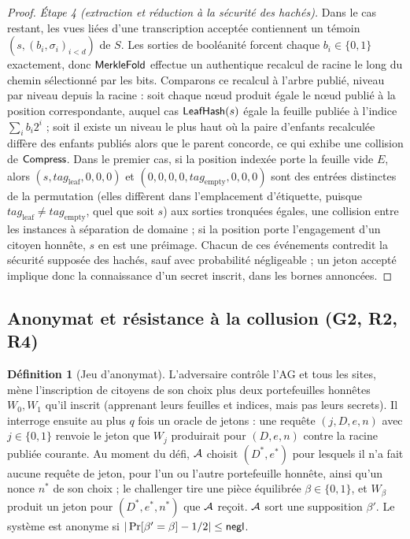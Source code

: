 \documentclass[11pt]{article}
\theoremstyle{definition}
\newtheorem{definitionx}{D\'efinition}
\begin{document}
\begin{proof}
\emph{Étape 4 (extraction et réduction à la sécurité des hachés).} Dans le cas restant,
les vues liées d'une transcription acceptée contiennent un témoin $(s, (b_i,
\sigma_i)_{i<d})$ de $S$. Les sorties de booléanité forcent chaque $b_i \in \{0,1\}$
exactement, donc $\mathsf{MerkleFold}$ effectue un authentique recalcul de racine le long du
chemin sélectionné par les bits. Comparons ce recalcul à l'arbre publié, niveau par niveau
depuis la racine : soit chaque n\oe ud produit égale le n\oe ud publié à la position
correspondante, auquel cas $\mathsf{LeafHash}(s)$ égale la feuille publiée à l'indice $\sum_i b_i
2^i$ ; soit il existe un niveau le plus haut où la paire d'enfants recalculée diffère des
enfants publiés alors que le parent concorde, ce qui exhibe une collision de $\mathsf{Compress}$.
Dans le premier cas, si la position indexée porte la feuille vide $E$, alors $(s,
\mathit{tag}_{\mathrm{leaf}}, 0, 0, 0)$ et $(0,0,0,0,\mathit{tag}_{\mathrm{empty}},0,0,0)$
sont des entrées distinctes de la permutation (elles diffèrent dans l'emplacement
d'étiquette, puisque $\mathit{tag}_{\mathrm{leaf}} \ne \mathit{tag}_{\mathrm{empty}}$, quel
que soit $s$) aux sorties tronquées égales, une collision
entre les instances à séparation de domaine ; si la position porte l'engagement d'un
citoyen honnête, $s$ en est une préimage. Chacun de ces événements contredit la sécurité
supposée des hachés, sauf avec probabilité négligeable ; un jeton accepté implique donc la
connaissance d'un secret inscrit, dans les bornes annoncées.
\end{proof}

\subsection{Anonymat et résistance à la collusion (G2, R2, R4)}

\begin{definitionx}[Jeu d'anonymat]
L'adversaire contrôle l'AG et tous les sites, mène l'inscription de citoyens de son choix
plus deux portefeuilles honnêtes $W_0, W_1$ qu'il inscrit (apprenant leurs feuilles et
indices, mais pas leurs secrets). Il interroge ensuite au plus $q$ fois un oracle de
jetons : une requête $(j, D, e, n)$ avec $j \in \{0,1\}$ renvoie le jeton que $W_j$
produirait pour $(D, e, n)$ contre la racine publiée courante. Au moment du défi, $\mathcal{A}$
choisit $(D^*, e^*)$ pour lesquels il n'a fait aucune requête de jeton, pour l'un ou
l'autre portefeuille honnête, ainsi qu'un nonce $n^*$ de son choix ; le challenger tire une pièce équilibrée $\beta \in \{0,1\}$, et
$W_\beta$ produit un jeton pour $(D^*, e^*, n^*)$ que $\mathcal{A}$ reçoit. $\mathcal{A}$
sort une supposition $\beta'$. Le système est anonyme si $|\Pr[\beta' = \beta] - 1/2| \le
\mathsf{negl}$.
\end{definitionx}
\end{document}
